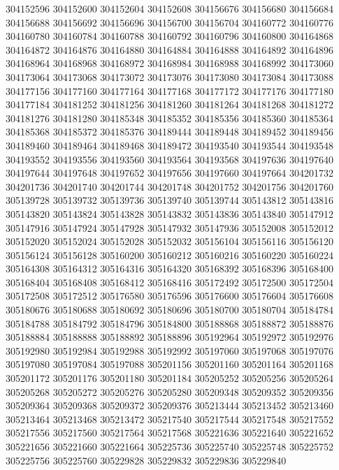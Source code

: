 { 304152596
 304152600
 304152604
 304152608
 304156676
 304156680
 304156684
 304156688
 304156692
 304156696
 304156700
 304156704
 304160772
 304160776
 304160780
 304160784
 304160788
 304160792
 304160796
 304160800
 304164868
 304164872
 304164876
 304164880
 304164884
 304164888
 304164892
 304164896
 304168964
 304168968
 304168972
 304168984
 304168988
 304168992
 304173060
 304173064
 304173068
 304173072
 304173076
 304173080
 304173084
 304173088
 304177156
 304177160
 304177164
 304177168
 304177172
 304177176
 304177180
 304177184
 304181252
 304181256
 304181260
 304181264
 304181268
 304181272
 304181276
 304181280
 304185348
 304185352
 304185356
 304185360
 304185364
 304185368
 304185372
 304185376
 304189444
 304189448
 304189452
 304189456
 304189460
 304189464
 304189468
 304189472
 304193540
 304193544
 304193548
 304193552
 304193556
 304193560
 304193564
 304193568
 304197636
 304197640
 304197644
 304197648
 304197652
 304197656
 304197660
 304197664
 304201732
 304201736
 304201740
 304201744
 304201748
 304201752
 304201756
 304201760
 305139728
 305139732
 305139736
 305139740
 305139744
 305143812
 305143816
 305143820
 305143824
 305143828
 305143832
 305143836
 305143840
 305147912
 305147916
 305147924
 305147928
 305147932
 305147936
 305152008
 305152012
 305152020
 305152024
 305152028
 305152032
 305156104
 305156116
 305156120
 305156124
 305156128
 305160200
 305160212
 305160216
 305160220
 305160224
 305164308
 305164312
 305164316
 305164320
 305168392
 305168396
 305168400
 305168404
 305168408
 305168412
 305168416
 305172492
 305172500
 305172504
 305172508
 305172512
 305176580
 305176596
 305176600
 305176604
 305176608
 305180676
 305180688
 305180692
 305180696
 305180700
 305180704
 305184784
 305184788
 305184792
 305184796
 305184800
 305188868
 305188872
 305188876
 305188884
 305188888
 305188892
 305188896
 305192964
 305192972
 305192976
 305192980
 305192984
 305192988
 305192992
 305197060
 305197068
 305197076
 305197080
 305197084
 305197088
 305201156
 305201160
 305201164
 305201168
 305201172
 305201176
 305201180
 305201184
 305205252
 305205256
 305205264
 305205268
 305205272
 305205276
 305205280
 305209348
 305209352
 305209356
 305209364
 305209368
 305209372
 305209376
 305213444
 305213452
 305213460
 305213464
 305213468
 305213472
 305217540
 305217544
 305217548
 305217552
 305217556
 305217560
 305217564
 305217568
 305221636
 305221640
 305221652
 305221656
 305221660
 305221664
 305225736
 305225740
 305225748
 305225752
 305225756
 305225760
 305229828
 305229832
 305229836
 305229840
}
